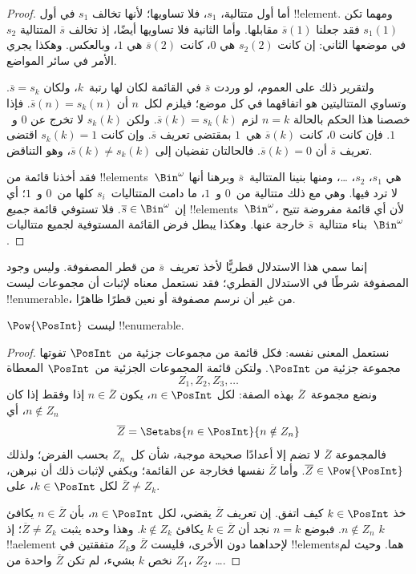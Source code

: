 \documentclass[../../../include/open-logic-section]{subfiles}
\begin{document}
\begin{proof}
أما أول متتالية، $s_1$، فلا تساويها؛ لأنها تخالف $s_1$ في أول !!{element}. ومهما تكن $s_1(1)$ فقد جعلنا $\overline{s}(1)$ مقابلها. وأما الثانية فلا تساويها أيضًا، إذ تخالف $\overline{s}$ المتتالية $s_2$ في موضعها الثاني: إن كانت $s_2(2)$ هي $0$، كانت $\overline{s}(2)$ هي $1$، وبالعكس. وهكذا يجري الأمر في سائر المواضع.

ولتقرير ذلك على العموم، لو وردت $\overline{s}$ في القائمة لكان لها رتبة~$k$، ولكان $\overline{s} = s_{k}$. وتساوي المتتاليتين هو اتفاقهما في كل موضع؛ فيلزم لكل~$n$ أن $\overline{s}(n) =
s_{k}(n)$. فإذا خصصنا هذا الحكم بالحالة $n = k$ لزم $\overline{s}(k) = s_{k}(k)$. ولكن $s_k(k)$ لا تخرج عن $0$ و~$1$. فإن كانت $0$، كانت $\overline{s}(k)$ هي~$1$ بمقتضى تعريف $\overline{s}$. وإن كانت $s_k(k) = 1$ اقتضى تعريف $\overline{s}$ أن $\overline{s}(k) = 0$. فالحالتان تفضيان إلى $\overline{s}(k) \neq s_{k}(k)$، وهو التناقض.

فقد أخذنا قائمة من !!{element}s~$\Bin^\omega$ هي $s_1$، $s_2$، \dots{}، ومنها بنينا المتتالية~$\overline{s}$ وبرهنا أنها لا ترد فيها. وهي مع ذلك متتالية من~$0$ و~$1$، ما دامت المتتاليات~$s_i$ كلها من~$0$ و~$1$؛ أي إن $\overline{s} \in
\Bin^\omega$. فلا تستوفي قائمة \emph{جميع} !!{element}s~$\Bin^\omega$، لأن أي قائمة مفروضة تتيح بناء متتالية~$\overline{s}$ خارجة عنها. وهكذا يبطل فرض القائمة المستوفية لجميع متتاليات~$\Bin^\omega$.
\end{proof}

\begin{explain}
إنما سمي هذا الاستدلال قطريًّا لأخذ تعريف~$\overline{s}$ من قطر المصفوفة. وليس وجود المصفوفة شرطًا في الاستدلال القطري؛ فقد نستعمل معناه لإثبات أن مجموعات ليست !!{enumerable}، من غير أن نرسم مصفوفة أو نعين قطرًا ظاهرًا.
\end{explain}

\begin{thm}
$\Pow{\PosInt}$ ليست !!{enumerable}.
\end{thm}

\begin{proof}
نستعمل المعنى نفسه: فكل قائمة من مجموعات جزئية من~$\PosInt$ تفوتها مجموعة جزئية من $\PosInt$. ولتكن قائمة المجموعات الجزئية من~$\PosInt$ المعطاة
\[
Z_{1}, Z_{2}, Z_{3}, \dots
\]
ونضع مجموعة~$\overline{Z}$ بهذه الصفة: لكل $n \in \PosInt$، يكون $n \in \overline{Z}$ إذا وفقط إذا كان $n \notin Z_{n}$، أي
\[
\overline{Z} = \Setabs{n \in \PosInt}{n \notin Z_n}
\]
فالمجموعة $\overline{Z}$ لا تضم إلا أعدادًا صحيحة موجبة، شأن كل~$Z_n$ بحسب الفرض؛ ولذلك $\overline{Z} \in
\Pow{\PosInt}$. وأما $\overline{Z}$ نفسها فخارجة عن القائمة؛ ويكفي لإثبات ذلك أن نبرهن، لكل $k \in \PosInt$، على $\overline{Z} \neq
Z_k$.

خذ $k \in \PosInt$ كيف اتفق. إن تعريف $\overline{Z}$ يقضي، لكل $n \in \PosInt$، بأن $n \in \overline{Z}$ يكافئ $n \notin Z_n$. فبوضع $n=k$ نجد أن $k \in \overline{Z}$ يكافئ $k \notin Z_k$. وهذا وحده يثبت $\overline{Z} \neq Z_k$؛ إذ $k$ !!a{element} لإحداهما دون الأخرى، فليست $\overline{Z}$ و$Z_k$ متفقتين في !!{element}sهما. وحيث لم نخص $k$ بشيء، لم تكن $\overline{Z}$ واحدة من $Z_1$، $Z_2$، \dots.
\end{proof}
\end{document}

